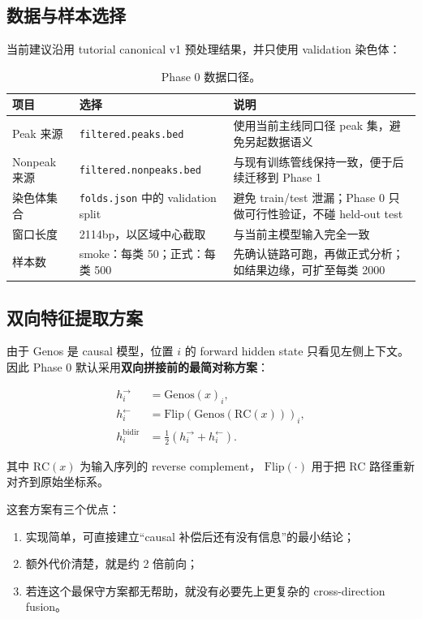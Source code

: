 \documentclass[11pt,a4paper]{ctexart}
\begin{document}
\subsection{数据与样本选择}

当前建议沿用 tutorial canonical v1 预处理结果，并只使用 validation 染色体：

\begin{table}[H]
\centering
\small
\caption{Phase 0 数据口径。}
\label{tab:phase0_data}
\begin{tabularx}{\textwidth}{l l Y}
\toprule
项目 & 选择 & 说明 \\
\midrule
Peak 来源 & \texttt{filtered.peaks.bed} & 使用当前主线同口径 peak 集，避免另起数据语义 \\
Nonpeak 来源 & \texttt{filtered.nonpeaks.bed} & 与现有训练管线保持一致，便于后续迁移到 Phase 1 \\
染色体集合 & \texttt{folds.json} 中的 validation split & 避免 train/test 泄漏；Phase 0 只做可行性验证，不碰 held-out test \\
窗口长度 & 2114bp，以区域中心截取 & 与当前主模型输入完全一致 \\
样本数 & smoke：每类 50；正式：每类 500 & 先确认链路可跑，再做正式分析；如结果边缘，可扩至每类 2000 \\
\bottomrule
\end{tabularx}
\end{table}

\subsection{双向特征提取方案}

由于 Genos 是 causal 模型，位置 $i$ 的 forward hidden state 只看见左侧上下文。
因此 Phase 0 默认采用\textbf{双向拼接前的最简对称方案}：

\begin{align}
h_i^{\rightarrow} &= \mathrm{Genos}(x)_i, \\
h_i^{\leftarrow} &= \mathrm{Flip}\left(\mathrm{Genos}(\mathrm{RC}(x))\right)_i, \\
h_i^{\mathrm{bidir}} &= \frac{1}{2}\left(h_i^{\rightarrow} + h_i^{\leftarrow}\right).
\end{align}

其中 $\mathrm{RC}(x)$ 为输入序列的 reverse complement，
$\mathrm{Flip}(\cdot)$ 用于把 RC 路径重新对齐到原始坐标系。

这套方案有三个优点：

\begin{enumerate}[leftmargin=2em]
  \item 实现简单，可直接建立“causal 补偿后还有没有信息”的最小结论；
  \item 额外代价清楚，就是约 2 倍前向；
  \item 若连这个最保守方案都无帮助，就没有必要先上更复杂的 cross-direction fusion。
\end{enumerate}
\end{document}
